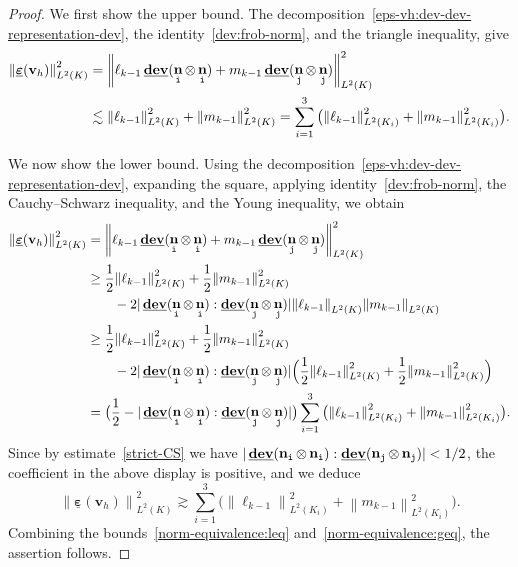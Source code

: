 \documentclass[a4paper,twoside,10pt]{article}
\theoremstyle{plain}
\theoremstyle{remark}
\theoremstyle{definition}
\numberwithin{equation}{section}
\numberwithin{figure}{section}
\newcommand{\Norm}[1]{{\left\|{#1} \right\|}}
\newcommand{\K}{K}
\newcommand{\vbfh}{\mathbf{v}_h}
\DeclareMathOperator{\dev}{\underline{\mathbf{dev}}}
\DeclareMathOperator{\norm}{\bf{n}}
\newcommand{\Ltwo}{L^2}
\newcommand{\epsbfun}{\underline{\boldsymbol{\varepsilon}}}
\newcommand{\lkmo}{\ell_{k-1}}
\newcommand{\mkmo}{m_{k-1}}
\newcommand{\Ki}{{\K_i}}
\newcommand{\itt}{\mathtt{i}}
\newcommand{\jtt}{\mathtt{j}}
\newcommand{\normitt}{\norm_{\itt}}
\newcommand{\normjtt}{\norm_{\jtt}}
\begin{document}
\begin{proof}
We first show the upper bound.
The decomposition~\eqref{eps-vh:dev-dev-representation-dev},
the identity~\eqref{dev:frob-norm},
and
the triangle inequality,
give
\begin{equation} \label{norm-equivalence:leq}
\begin{split}
\Norm{\epsbfun(\vbfh)}_{\Ltwo(\K)}^2
&= \Norm{\lkmo\dev(\normitt\otimes\normitt) + \mkmo\dev(\normjtt\otimes\normjtt)}_{\Ltwo(\K)}^2 \\
&\lesssim \Norm{\lkmo}_{\Ltwo(\K)}^2 + \Norm{\mkmo}_{\Ltwo(\K)}^2
= \sum_{i=1}^3 \big(\Norm{\lkmo}_{\Ltwo(\Ki)}^2 + \Norm{\mkmo}_{\Ltwo(\Ki)}^2\big).
\end{split}
\end{equation}

We now show the lower bound.
Using the decomposition~\eqref{eps-vh:dev-dev-representation-dev},
expanding the square,
applying identity~\eqref{dev:frob-norm},
the Cauchy--Schwarz inequality,
and the Young inequality,
we obtain
\begin{equation*}
\begin{split}
\Norm{\epsbfun(\vbfh)}_{\Ltwo(\K)}^2
&= \Norm{\lkmo\dev(\normitt\otimes\normitt) + \mkmo\dev(\normjtt\otimes\normjtt)}_{\Ltwo(\K)}^2 \\
&\geq \frac12\Norm{\lkmo}_{\Ltwo(\K)}^2 + \frac12\Norm{\mkmo}_{\Ltwo(\K)}^2 \\
&\qquad        - 2  |\dev(\normitt\otimes\normitt):\dev(\normjtt\otimes\normjtt)| \Norm{\lkmo}_{\Ltwo(\K)}\Norm{\mkmo}_{\Ltwo(\K)} \\
&\geq \frac12\Norm{\lkmo}_{\Ltwo(\K)}^2 + \frac12\Norm{\mkmo}_{\Ltwo(\K)}^2 \\
&\qquad        - 2|\dev(\normitt\otimes\normitt):\dev(\normjtt\otimes\normjtt)| \Big(\frac12\Norm{\lkmo}_{\Ltwo(\K)}^2
                    + \frac12\Norm{\mkmo}_{\Ltwo(\K)}^2\Big) \\
&= \big(\frac12-|\dev(\normitt\otimes\normitt):\dev(\normjtt\otimes\normjtt)|\big)
    \sum_{i=1}^3 \big(\Norm{\lkmo}_{\Ltwo(\Ki)}^2 + \Norm{\mkmo}_{\Ltwo(\Ki)}^2 \big) .
\end{split}
\end{equation*}
Since by estimate~\eqref{strict-CS} we have
$|\dev(\normitt\otimes\normitt):\dev(\normjtt\otimes\normjtt)| < 1/2$,
the coefficient in the above display
is positive,
and we deduce
\begin{equation} \label{norm-equivalence:geq}
\Norm{\epsbfun(\vbfh)}_{\Ltwo(\K)}^2 \gtrsim  \sum_{i=1}^3 \big(\Norm{\lkmo}_{\Ltwo(\Ki)}^2 + \Norm{\mkmo}_{\Ltwo(\Ki)}^2\big).
\end{equation}
Combining the bounds~\eqref{norm-equivalence:leq} and~\eqref{norm-equivalence:geq},
the assertion follows.
\end{proof}
\end{document}
